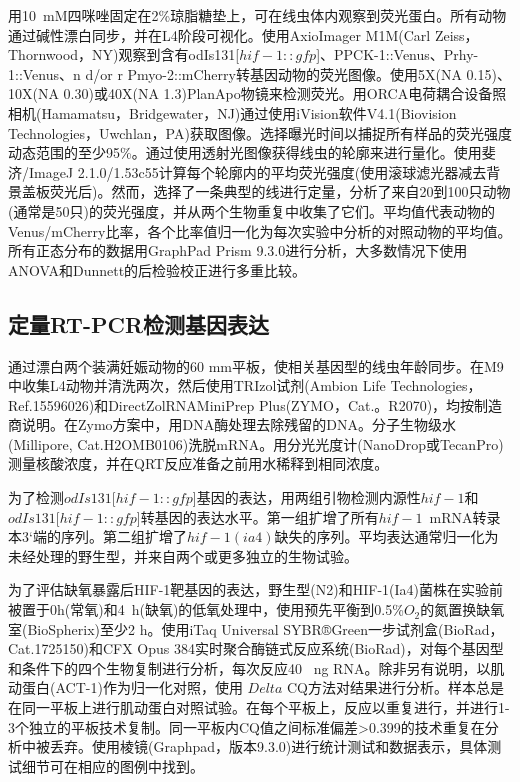 \documentclass{ctexart}
\begin{document}
        用10~mM四咪唑固定在2\%琼脂糖垫上，可在线虫体内观察到荧光蛋白。所有动物通过碱性漂白同步，并在L4阶段可视化。使用AxioImager M1M(Carl Zeiss，Thornwood，NY)观察到含有odIs131[$hif-1::gfp$]、PPCK-1::Venus、Prhy-1::Venus、n d/or r Pmyo-2::mCherry转基因动物的荧光图像。使用5X(NA 0.15)、10X(NA 0.30)或40X(NA 1.3)PlanApo物镜来检测荧光。用ORCA电荷耦合设备照相机(Hamamatsu，Bridgewater，NJ)通过使用iVision软件V4.1(Biovision Technologies，Uwchlan，PA)获取图像。选择曝光时间以捕捉所有样品的荧光强度动态范围的至少95\%。通过使用透射光图像获得线虫的轮廓来进行量化。使用斐济/ImageJ 2.1.0/1.53c55计算每个轮廓内的平均荧光强度(使用滚球滤光器减去背景盖板荧光后)。然而，选择了一条典型的线进行定量，分析了来自20到100只动物(通常是50只)的荧光强度，并从两个生物重复中收集了它们。平均值代表动物的Venus/mCherry比率，各个比率值归一化为每次实验中分析的对照动物的平均值。所有正态分布的数据用GraphPad Prism 9.3.0进行分析，大多数情况下使用ANOVA和Dunnett的后检验校正进行多重比较。

    \subsection{定量RT-PCR检测基因表达}

        通过漂白两个装满妊娠动物的60 mm平板，使相关基因型的线虫年龄同步。在M9中收集L4动物并清洗两次，然后使用TRIzol试剂(Ambion Life Technologies，Ref.15596026)和DirectZolRNAMiniPrep Plus(ZYMO，Cat.。R2070)，均按制造商说明。在Zymo方案中，用DNA酶处理去除残留的DNA。分子生物级水(Millipore, Cat.H2OMB0106)洗脱mRNA。用分光光度计(NanoDrop或TecanPro)测量核酸浓度，并在QRT反应准备之前用水稀释到相同浓度。

        为了检测$odIs131[hif-1::gfp$]基因的表达，用两组引物检测内源性$hif-1$和$odIs131[hif-1::gfp$]转基因的表达水平。第一组扩增了所有$hif-1$~mRNA转录本3‘端的序列。第二组扩增了$hif-1(ia4)$缺失的序列。平均表达通常归一化为未经处理的野生型，并来自两个或更多独立的生物试验。
        
        为了评估缺氧暴露后HIF-1靶基因的表达，野生型(N2)和HIF-1(Ia4)菌株在实验前被置于0h(常氧)和4~h(缺氧)的低氧处理中，使用预先平衡到0.5\%$O_2$的氮置换缺氧室(BioSpherix)至少2 h。使用iTaq Universal SYBR®Green一步试剂盒(BioRad，Cat.1725150)和CFX Opus 384实时聚合酶链式反应系统(BioRad)，对每个基因型和条件下的四个生物复制进行分析，每次反应40~
        ng RNA。除非另有说明，以肌动蛋白(ACT-1)作为归一化对照，使用 $Delta$ CQ方法对结果进行分析。样本总是在同一平板上进行肌动蛋白对照试验。在每个平板上，反应以重复进行，并进行1-3个独立的平板技术复制。同一平板内CQ值之间标准偏差>0.399的技术重复在分析中被丢弃。使用棱镜(Graphpad，版本9.3.0)进行统计测试和数据表示，具体测试细节可在相应的图例中找到。
\end{document}
